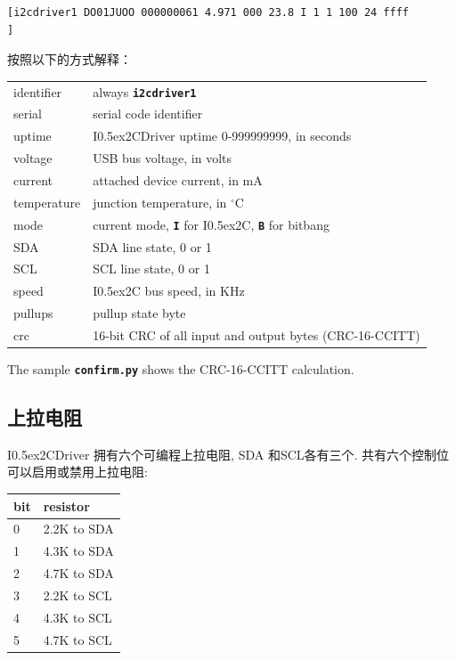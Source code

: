 \documentclass{article}
\newcommand{\two}{\raise0.5ex\hbox{\footnotesize{2}}}
\newcommand{\iic}{I\two{}C}
\newcommand{\iicdriver}{I\two{}CDriver}
\newcommand{\degc}{$^{\circ}$C}
\newcommand{\mach}[1]{\texttt{\textbf{#1}}}
\newcommand{\gap}{\vspace{10pt}}
\begin{document}
\begin{lstlisting}
[i2cdriver1 DO01JUOO 000000061 4.971 000 23.8 I 1 1 100 24 ffff                ]
\end{lstlisting}

按照以下的方式解释： 

\gap\begin{tabular}{ll}
\hline
identifier     & always \mach{i2cdriver1} \\
serial         & serial code identifier \\
uptime         & \iicdriver{} uptime 0-999999999, in seconds \\
voltage        & USB bus voltage, in volts \\
current        & attached device current, in mA \\
temperature    & junction temperature, in \degc \\
mode           & current mode, \mach{I} for \iic{}, \mach{B} for bitbang \\
SDA            & SDA line state, 0 or 1 \\
SCL            & SCL line state, 0 or 1 \\
speed          & \iic{} bus speed, in KHz \index{speed}\\
pullups        & pullup state byte \\
crc            & 16-bit CRC of all input and output bytes (CRC-16-CCITT) \index{CRC} \\
\hline\end{tabular}\gap

The sample \mach{confirm.py} shows the CRC-16-CCITT calculation.

\subsection{上拉电阻}

\iicdriver{} 拥有六个可编程上拉电阻, SDA 和SCL各有三个.
共有六个控制位可以启用或禁用上拉电阻:

\begin{center}\begin{tabular}{ll}
\hline
bit & resistor \\
\hline
 0  & 2.2K to SDA \\
 1  & 4.3K to SDA \\
 2  & 4.7K to SDA \\
 3  & 2.2K to SCL \\
 4  & 4.3K to SCL \\
 5  & 4.7K to SCL \\
\hline
\end{tabular}\end{center}\gap
\end{document}
